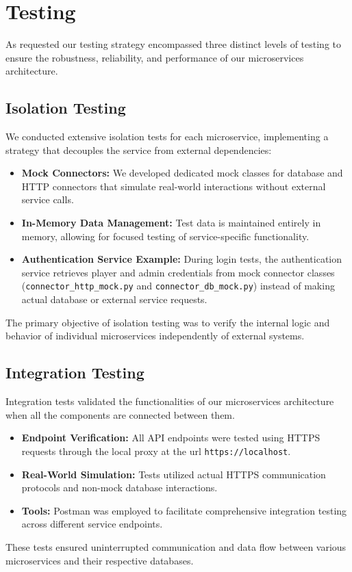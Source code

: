 \documentclass{article}
\begin{document}
\newpage

\section{Testing} \label{sec:testing_approach}
As requested our testing strategy encompassed three distinct levels of testing to ensure the robustness, reliability, and performance of our microservices architecture.

\subsection{Isolation Testing}
We conducted extensive isolation tests for each microservice, implementing a strategy that decouples the service from external dependencies:
\begin{itemize}
    \item \textbf{Mock Connectors:} We developed dedicated mock classes for database and HTTP connectors that simulate real-world interactions without external service calls.
    \item \textbf{In-Memory Data Management:} Test data is maintained entirely in memory, allowing for focused testing of service-specific functionality.
    \item \textbf{Authentication Service Example:} During login tests, the authentication service retrieves player and admin credentials from mock connector classes (\texttt{connector\_http\_mock.py} and \texttt{connector\_db\_mock.py}) instead of making actual database or external service requests.
\end{itemize}

The primary objective of isolation testing was to verify the internal logic and behavior of individual microservices independently of external systems.

\subsection{Integration Testing}
Integration tests validated the functionalities of our microservices architecture when all the components are connected between them.
\begin{itemize}
    \item \textbf{Endpoint Verification:} All API endpoints were tested using HTTPS requests through the local proxy at the url \texttt{https://localhost}.
    \item \textbf{Real-World Simulation:} Tests utilized actual HTTPS communication protocols and non-mock database interactions.
    \item \textbf{Tools:} Postman was employed to facilitate comprehensive integration testing across different service endpoints.
\end{itemize}
These tests ensured uninterrupted communication and data flow between various microservices and their respective databases.
\end{document}
